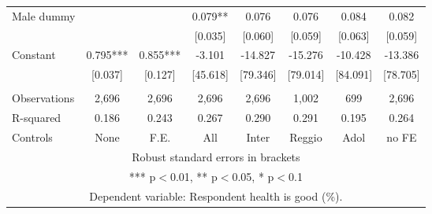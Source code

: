 \begin{tabular}{lccccccc}
Male dummy &  &  & 0.079** & 0.076 & 0.076 & 0.084 & 0.082 \\
 &  &  & [0.035] & [0.060] & [0.059] & [0.063] & [0.059] \\
Constant & 0.795*** & 0.855*** & -3.101 & -14.827 & -15.276 & -10.428 & -13.386 \\
 & [0.037] & [0.127] & [45.618] & [79.346] & [79.014] & [84.091] & [78.705] \\
 &  &  &  &  &  &  &  \\
Observations & 2,696 & 2,696 & 2,696 & 2,696 & 1,002 & 699 & 2,696 \\
R-squared & 0.186 & 0.243 & 0.267 & 0.290 & 0.291 & 0.195 & 0.264 \\
 Controls & None & F.E. & All & Inter & Reggio & Adol & no FE \\ \hline
\multicolumn{8}{c}{ Robust standard errors in brackets} \\
\multicolumn{8}{c}{ *** p$<$0.01, ** p$<$0.05, * p$<$0.1} \\
\multicolumn{8}{c}{ Dependent variable: Respondent health is good (\%).} \\
\end{tabular}
